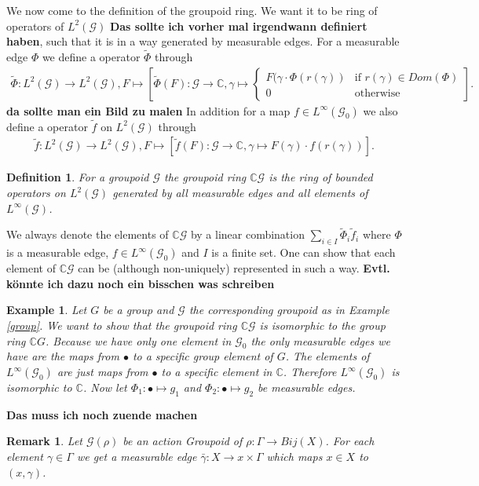 \documentclass[12pt,a4paper]{scrartcl}
\newtheorem{Definition}[Theorem]{Definition}
\newtheorem{Example}[Theorem]{Example}
\newtheorem{Remark}[Theorem]{Remark}
\numberwithin{equation}{section}
\newcommand{\C}{\mathbb{C}} %
\newcommand{\2}{\mathbb{Z} / 2 \mathbb{Z}}
\newcommand{\G}{\mathcal{G}}
\begin{document}
We now come to the definition of the groupoid ring. We want it to be ring of operators of $L^2(\G)$ \textbf{Das sollte ich vorher mal irgendwann definiert haben}, such that it is in a way generated by measurable edges. For a measurable edge $\Phi$ we define a operator $\tilde \Phi$ through
\begin{align*}
	\tilde \Phi: L^2(\G) \to L^2(\G), F \mapsto [\tilde \Phi (F): \G \to \C, \gamma \mapsto \begin{cases}
	F(\gamma \cdot \Phi(r(\gamma)) & \text{if } r(\gamma) \in Dom(\Phi) \\
	0 & \text{otherwise}
	\end{cases}].
\end{align*}
\textbf{da sollte man ein Bild zu malen}
In addition for a map $f \in L^\infty (\G_0)$ we also define a operator $\tilde f$ on $L^2(\G)$ through
\begin{align*}
	\tilde f: L^2(\G) \to L^2(\G), F \mapsto [\tilde f(F): \G \to \C, \gamma \mapsto F(\gamma) \cdot f(r(\gamma))].
\end{align*}
\begin{Definition}
	For a groupoid $\G$ the groupoid ring $\C\G$ is the ring of bounded operators on $L^2(\G)$ generated by all measurable edges and all elements of $L^\infty(\G)$.
\end{Definition}
We always denote the elements of $\C\G$ by a linear combination $\sum_{i \in I} \tilde \Phi_i \tilde f_i$ where $\Phi$ is a measurable edge, $f \in L^\infty(\G_0)$ and $I$ is a finite set. One can show that each element of $\C \G$ can be (although non-uniquely) represented in such a way. \textbf{Evtl. könnte ich dazu noch ein bisschen was schreiben}
\begin{Example}
	Let $G$ be a group and $\G$ the corresponding groupoid as in Example \ref{group}. We want to show that the groupoid ring $\C \G$ is isomorphic to the group ring $\C G$. Because we have only one element in $\G_0$ the only measurable edges we have are the maps from $\bullet$ to a specific group element of $G$. The elements of $L^\infty(\G_0)$ are just maps from $\bullet$ to a specific element in $\C$. Therefore  $L^\infty(\G_0)$ is isomorphic to $\C$. Now let $\Phi_1: \bullet \mapsto g_1$ and $\Phi_2: \bullet \mapsto g_2$ be measurable edges. 
\end{Example}
\textbf{Das muss ich noch zuende machen}
\begin{Remark}
	Let $\G(\rho)$ be an action Groupoid of $\rho: \Gamma \to Bij(X)$. For each element $\gamma \in \Gamma$ we get a measurable edge $\bar{\gamma}: X \to x \times \Gamma$ which maps $x \in X$ to $(x, \gamma)$.
\end{Remark}
\end{document}
